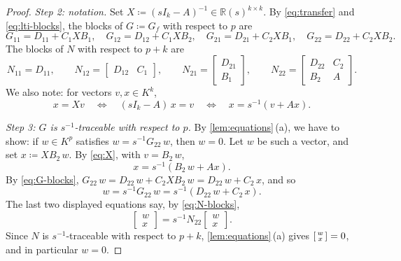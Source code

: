 \documentclass[11pt,a4paper]{article}
\theoremstyle{plain}
\theoremstyle{definition}
\theoremstyle{remark}
\newcommand{\Rs}{\mathbb{R}(s)}
\begin{document}
\begin{proof}
    \emph{Step 2: notation.}
    Set $X \coloneqq (s I_k - A)^{-1} \in \Rs^{k \times k}$.
    By \cref{eq:transfer} and \cref{eq:lti-blocks}, the blocks of $G \coloneqq G_f$ with respect to $p$ are
    \begin{equation}
        \label{eq:G-blocks}
        G_{11} = D_{11} + C_1 X B_1,
        \quad
        G_{12} = D_{12} + C_1 X B_2,
        \quad
        G_{21} = D_{21} + C_2 X B_1,
        \quad
        G_{22} = D_{22} + C_2 X B_2 .
    \end{equation}
    The blocks of $N$ with respect to $p + k$ are
    \begin{equation}
        \label{eq:N-blocks}
        N_{11} = D_{11},
        \qquad
        N_{12} = \begin{bmatrix} D_{12} & C_1 \end{bmatrix},
        \qquad
        N_{21} = \begin{bmatrix} D_{21} \\ B_1 \end{bmatrix},
        \qquad
        N_{22} = \begin{bmatrix} D_{22} & C_2 \\ B_2 & A \end{bmatrix} .
    \end{equation}
    We also note: for vectors $v, x \in K^k$,
    \begin{equation}
        \label{eq:X}
        x = X v
        \quad \Longleftrightarrow \quad
        (s I_k - A)\, x = v
        \quad \Longleftrightarrow \quad
        x = s^{-1} ( v + A x ) .
    \end{equation}

    \emph{Step 3: $G$ is $s^{-1}$-traceable with respect to $p$.}
    By \cref{lem:equations}\,(a), we have to show: if $w \in K^p$ satisfies $w = s^{-1} G_{22}\, w$, then $w = 0$.
    Let $w$ be such a vector, and set $x \coloneqq X B_2\, w$.
    By \cref{eq:X}, with $v = B_2\, w$,
    \begin{equation*}
        x = s^{-1} ( B_2\, w + A x ) .
    \end{equation*}
    By \cref{eq:G-blocks}, $G_{22}\, w = D_{22}\, w + C_2 X B_2\, w = D_{22}\, w + C_2\, x$, and so
    \begin{equation*}
        w = s^{-1} G_{22}\, w = s^{-1} ( D_{22}\, w + C_2\, x ) .
    \end{equation*}
    The last two displayed equations say, by \cref{eq:N-blocks},
    \begin{equation*}
        \begin{bmatrix} w \\ x \end{bmatrix} = s^{-1} N_{22} \begin{bmatrix} w \\ x \end{bmatrix} .
    \end{equation*}
    Since $N$ is $s^{-1}$-traceable with respect to $p + k$, \cref{lem:equations}\,(a) gives $\begin{bsmallmatrix} w \\ x \end{bsmallmatrix} = 0$, and in particular $w = 0$.


\end{proof}
\end{document}

